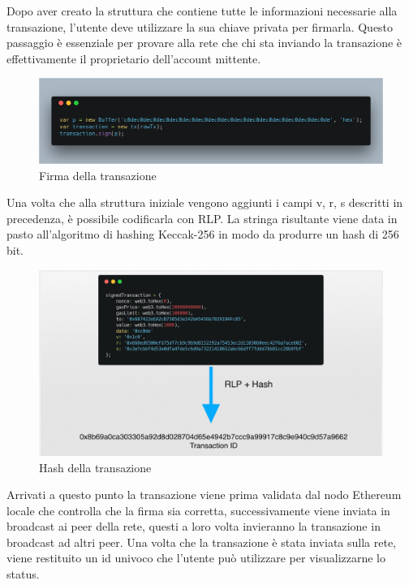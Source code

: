 \documentclass[12pt]{report}
\begin{document}
Dopo aver creato la struttura che contiene tutte le informazioni necessarie alla transazione, l'utente deve utilizzare la sua chiave privata per firmarla. Questo passaggio è essenziale per provare alla rete che chi sta inviando la transazione è effettivamente il proprietario dell'account mittente.

\begin{figure}[H]
    \centering\includegraphics[width=\textwidth]{carbon-9}
    \caption{Firma della transazione}
\end{figure}

\newline
Una volta che alla struttura iniziale vengono aggiunti i campi v, r, s descritti in precedenza, è possibile codificarla con RLP. La stringa risultante viene data in pasto all'algoritmo di hashing Keccak-256 in modo da produrre un hash di 256 bit.

\begin{figure}[H]
    \centering\includegraphics[width=\textwidth]{rlpHash}
    \caption{Hash della transazione}
\end{figure}

Arrivati a questo punto la transazione viene prima validata dal nodo Ethereum locale che controlla che la firma sia corretta, successivamente viene inviata in broadcast ai peer della rete, questi a loro volta invieranno la transazione in broadcast ad altri peer.
Una volta che la transazione è stata inviata sulla rete, viene restituito un id univoco che l'utente può utilizzare per visualizzarne lo status.
\end{document}
